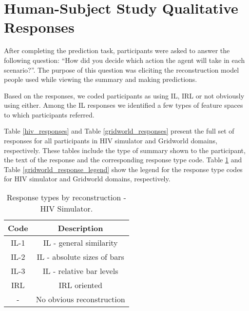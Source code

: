 \documentclass{article}
\begin{document}
\section{Human-Subject Study Qualitative Responses}
After completing the prediction task, participants were asked to answer the following question: ``How did you decide which action the agent will take in each scenario?''. The purpose of this question was eliciting the reconstruction model people used while viewing the summary and making predictions. 

Based on the responses, we coded participants as using IL, IRL or not obviously using either. Among the IL responses we identified a few types of feature spaces to which participants referred. 

Table \ref{hiv_responses} and Table \ref{gridworld_responses} present the full set of responses for all participants in HIV simulator and Gridworld domains, respectively. These tables include the type of summary shown to the participant, the text of the response and the corresponding response type code. Table \ref{hiv_response_legend} and Table \ref{gridworld_response_legend} show the legend for the response type codes for HIV simulator and Gridworld domains, respectively. 

\begin{table}[h]
\centering
\begin{tabular}{ |c|c| }
\hline
 Code & Description \\ \hline
 IL-1 & IL - general similarity \\ 
 IL-2 & IL - absolute sizes of bars \\
 IL-3 & IL - relative bar levels \\
 IRL & IRL oriented \\
   -  & No obvious reconstruction \\
 \hline
\end{tabular}
\caption{Response types by reconstruction - HIV Simulator.
\label{hiv_response_legend}}
\end{table}
\end{document}
